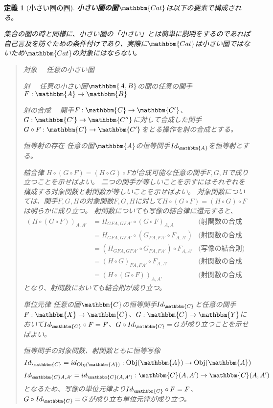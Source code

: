 \documentclass[uplatex,dvipdfmx]{jsarticle}
\newcommand{\cat}[1]{\mathbbm{#1}}
\newcommand{\arrow}{\rightarrow}
\newcommand{\functor}[3]{#1:\cat{#2}\arrow \cat{#3}}
\newcommand{\obj}[1]{\mathrm{Obj}(\cat{#1})}
\newcommand{\mor}[3]{#1:#2\arrow #3}
\newcommand{\arset}[3]{\cat{#1}(#2,#3)}
\newtheorem{define}[proof]{定義}
\numberwithin{proof}{subsection}
\newenvironment{mydescription}
{\begin{description}
  \setlength{\parskip}{0.5cm}
}
{\end{description}}
\begin{document}
	\begin{define}[小さい圏の圏]
		\textbf{小さい圏の圏}$\cat{Cat}$は以下の要素で構成される。

		集合の圏の時と同様に、小さい圏の「小さい」とは簡単に説明をするのであれば自己言及を防ぐための条件付けであり、実際に$\cat{Cat}$は小さい圏ではないため$\cat{Cat}$の対象にはならない。
		\begin{quote}
			\begin{mydescription}
				\item[対象]　任意の小さい圏
				\item[射]　任意の小さい圏$\cat{A,B}$の間の任意の関手$\functor{F}{A}{B}$
				\item[射の合成]　関手$\functor{F}{C}{C'}$、$\functor{G}{C'}{C''}$に対して合成した関手$\functor{G\circ F}{C}{C'}$をとる操作を射の合成とする。
				\item[恒等射の存在]任意の圏$\cat{A}$の恒等関手$Id_{\cat{A}}$を恒等射とする。
				\item[結合律]
				$H\circ (G\circ F)=(H\circ G)\circ F$が合成可能な任意の関手$F,G,H$で成り立つことを示せばよい。
				二つの関手が等しいことを示すにはそれぞれを構成する対象関数と射関数が等しいことを示せばよい。
				対象関数については、関手$F,G,H$の対象関数$F,G,H$に対して$H\circ (G\circ F)=(H\circ G)\circ F$は明らかに成り立つ。
				射関数についても写像の結合律に還元すると、
				\begin{align*}
					(H\circ (G\circ F))_{A,A'}&=H_{GFA,GFA'}\circ (G\circ F)_{A,A}&\text{(射関数の合成の定義)}\\
					&=H_{GFA,GFA'}\circ (G_{FA,FA'}\circ F_{A,A'})&\text{(射関数の合成の定義)}\\
					&=(H_{GFA,GFA'}\circ G_{FA,FA'})\circ F_{A,A'}&\text{(写像の結合則)}\\
					&=(H\circ G)_{FA,FA'}\circ F_{A,A'}&\text{(射関数の合成の定義)}\\
					&=(H\circ (G\circ F))_{A,A'}&\text{(射関数の合成の定義)}
				\end{align*}
				となり、射関数においても結合則が成り立つ。
				\item[単位元律]
				任意の圏$\cat{C}$の恒等関手$Id_{\cat{C}}$と任意の関手$\functor{F}{X}{C}$、$\functor{G}{C}{Y}$において$Id_{\cat{C}}\circ F=F$、$G\circ Id_{\cat{C}}=G$が成り立つことを示せばよい。

				恒等関手の対象関数、射関数ともに恒等写像
				\[\mor{Id_\cat{C}=id_{\obj{A}}}{\obj{A}}{\obj{A}}\]
				\[\mor{Id_{\cat{C}A,A'}=id_{\arset{C}{A}{A'}}}{\arset{C}{A}{A'}}{\arset{C}{A}{A'}}\]
				となるため、写像の単位元律より$Id_{\cat{C}}\circ F=F$、$G\circ Id_{\cat{C}}=G$が成り立ち単位元律が成り立つ。
			\end{mydescription}
		\end{quote}
	\end{define}
\end{document}
